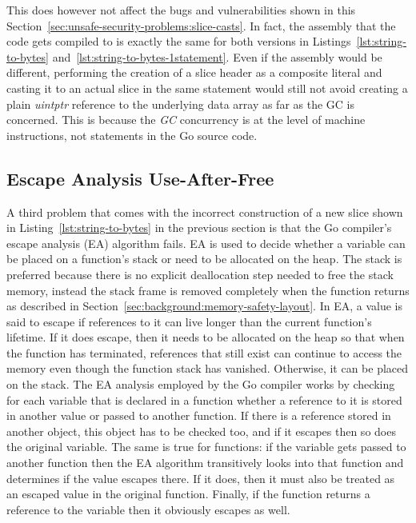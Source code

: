 

This does however not affect the bugs and vulnerabilities shown in this
Section~\ref{sec:unsafe-security-problems:slice-casts}.
In fact, the assembly that the code gets compiled to is exactly the same for both versions in
Listings~\ref{lst:string-to-bytes} and~\ref{lst:string-to-bytes-1statement}.
Even if the assembly would be different, performing the creation of a slice header as a composite literal and casting it
to an actual slice in the same statement would still not avoid creating a plain \textit{uintptr} reference to the
underlying data array as far as the \acrshort{GC} is concerned.
This is because the \textit{GC} concurrency is at the level of machine instructions, not statements in the Go source
code.



\subsection{Escape Analysis Use-After-Free}\label{subsec:unsafe-security-problems:slice-casts:escape-analysis}

A third problem that comes with the incorrect construction of a new slice shown in Listing~\ref{lst:string-to-bytes} in
the previous section is that the Go compiler's escape analysis (\acrshort{EA}) algorithm fails.
\acrshort{EA} is used to decide whether a variable can be placed on a function's stack or need to be allocated on the
heap.
The stack is preferred because there is no explicit deallocation step needed to free the stack memory, instead the stack
frame is removed completely when the function returns as described in Section~\ref{sec:background:memory-safety-layout}.
In \acrshort{EA}, a value is said to escape if references to it can live longer than the current function's lifetime.
If it does escape, then it needs to be allocated on the heap so that when the function has terminated, references that
still exist can continue to access the memory even though the function stack has vanished.
Otherwise, it can be placed on the stack.
The \acrshort{EA} analysis employed by the Go compiler works by checking for each variable that is declared in a
function whether a reference to it is stored in another value or passed to another function.
If there is a reference stored in another object, this object has to be checked too, and if it escapes then so does the
original variable.
The same is true for functions: if the variable gets passed to another function then the \acrshort{EA} algorithm
transitively looks into that function and determines if the value escapes there.
If it does, then it must also be treated as an escaped value in the original function.
Finally, if the function returns a reference to the variable then it obviously escapes as well.

